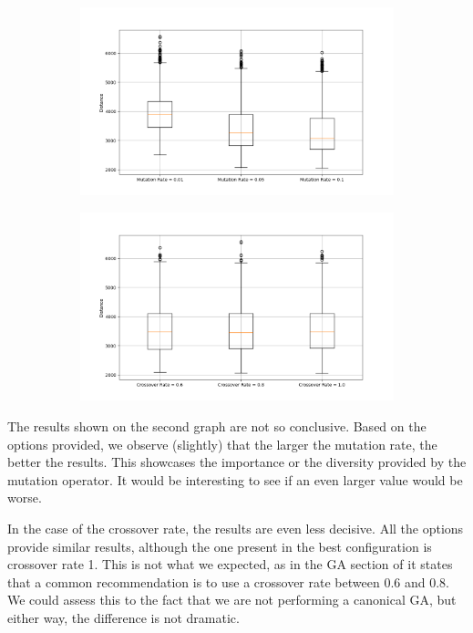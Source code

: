 \documentclass[11pt]{article}
\begin{document}
\begin{figure}[H]
    \centering
    \begin{subfigure}{0.48\textwidth}
        \includegraphics[width=\textwidth]{../results/mutation_rate_boxplot.png}
        \label{fig:m_rate}
    \end{subfigure}
    \begin{subfigure}{0.48\textwidth}
        \includegraphics[width=\textwidth]{../results/crossover_rate_boxplot.png}
        \label{fig:c_rate}
    \end{subfigure}
\end{figure}

The results shown on the second graph are not so conclusive. Based on the options provided, we observe (slightly) that the larger the mutation rate, the better the results. This showcases the importance or the diversity provided by the mutation operator. It would be interesting to see if an even larger value would be worse. 

In the case of the crossover rate, the results are even less decisive. All the options provide similar results, although the one present in the best configuration is crossover rate 1. This is not what we expected, as in the GA section of \cite{Eiben2003} it states that a common recommendation is to use a crossover rate between 0.6 and 0.8. We could assess this to the fact that we are not performing a canonical GA, but either way, the difference is not dramatic. 
\end{document}
